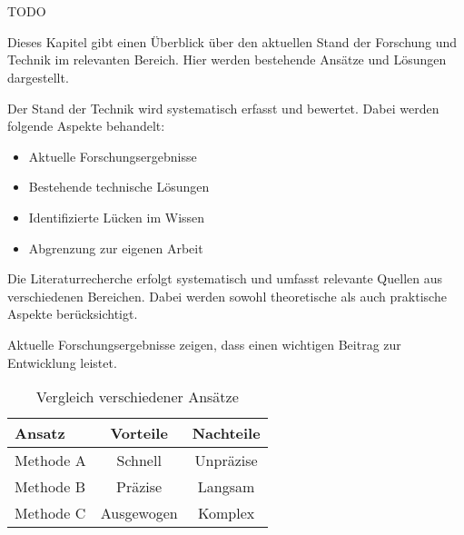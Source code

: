 
\chapter{\relatedWorkLabel}\label{cha:relatedWork}

TODO

Dieses Kapitel gibt einen Überblick über den aktuellen Stand der Forschung und Technik im relevanten Bereich. 
Hier werden bestehende Ansätze und Lösungen dargestellt.

Der Stand der Technik wird systematisch erfasst und bewertet. Dabei werden folgende Aspekte behandelt:

\begin{itemize}[leftmargin=0.63cm, label=\textbullet]
    \item Aktuelle Forschungsergebnisse
    \item Bestehende technische Lösungen
    \item Identifizierte Lücken im Wissen
    \item Abgrenzung zur eigenen Arbeit
\end{itemize}

Die Literaturrecherche erfolgt systematisch und umfasst relevante Quellen aus verschiedenen Bereichen. 
Dabei werden sowohl theoretische als auch praktische Aspekte berücksichtigt.

Aktuelle Forschungsergebnisse zeigen, dass \cite{mustermann2023} einen wichtigen Beitrag zur Entwicklung leistet.

\begin{table}[htbp]
    \centering
    \caption{Vergleich verschiedener Ansätze}
    \label{tab:vergleich}
        \begin{tabular}{lcc}
        \toprule
        Ansatz & Vorteile & Nachteile \\
        \midrule
        Methode A & Schnell & Unpräzise \\
        Methode B & Präzise & Langsam \\
        Methode C & Ausgewogen & Komplex \\
        \bottomrule
        \end{tabular}
\end{table}


